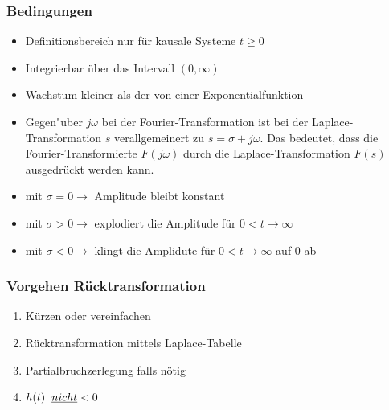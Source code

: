 \begin{multicols}{2}
\begin{center}
\subsubsection{Bedingungen}
\begin{itemize}
		\item Definitionsbereich nur für kausale Systeme $t\geq 0$\\
		\item Integrierbar über das Intervall $(0,\infty)$\\
		\item Wachstum kleiner als der von einer Exponentialfunktion\\ 
		\item Gegen"uber $j\omega$ bei der Fourier-Transformation ist bei der
			Laplace-Transformation $s$ verallgemeinert zu $s=\sigma + j\omega$. Das
			bedeutet, dass die Fourier-Transformierte $F(j\omega)$ durch die
			Laplace-Transformation $F(s)$ ausgedr\"uckt werden kann. \\
		\item mit $\sigma = 0 \rightarrow$ Amplitude bleibt konstant\\
		\item mit $\sigma > 0 \rightarrow$ explodiert die Amplitude f\"ur $0 < t \rightarrow \infty$ \\
		\item mit $\sigma < 0 \rightarrow$ klingt die Amplidute für $0 < t \rightarrow \infty$ auf $0$ ab
\end{itemize}

	\subsubsection{Vorgehen Rücktransformation }
		\begin{enumerate}
			\item Kürzen oder vereinfachen
			\item Rücktransformation mittels Laplace-Tabelle
			\item Partialbruchzerlegung falls nötig
			\item $h(t)\hspace{0.2cm}\underline{nicht} < 0$
		\end{enumerate}
	\end{center}
\end{multicols}

